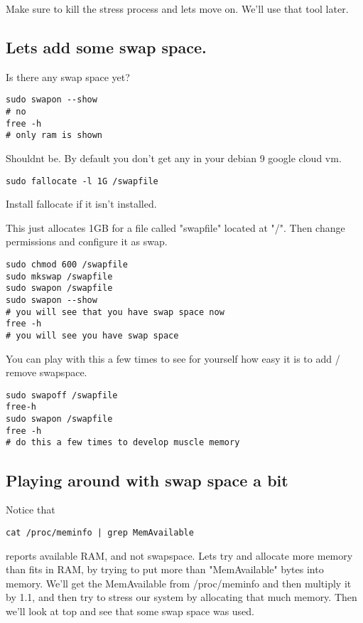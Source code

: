 \documentclass[10pt]{article}
\begin{document}
Make sure to kill the stress process and lets move on. We'll use that tool later.

\subsection{ Lets add some swap space.}
Is there any swap space yet?

\begin{lstlisting}
sudo swapon --show
# no
free -h
# only ram is shown
\end{lstlisting}

Shouldnt be. By default you don't get any in your debian 9 google cloud vm.


\begin{lstlisting}
sudo fallocate -l 1G /swapfile
\end{lstlisting}

Install fallocate if it isn't installed.

This just allocates 1GB for a file called "swapfile" located at "/". Then change permissions and configure it as swap.

\begin{lstlisting}
sudo chmod 600 /swapfile
sudo mkswap /swapfile
sudo swapon /swapfile
sudo swapon --show 
# you will see that you have swap space now
free -h
# you will see you have swap space
\end{lstlisting}

You can play with this a few times to see for yourself how easy it is to add / remove swapspace.

\begin{lstlisting}
sudo swapoff /swapfile
free-h
sudo swapon /swapfile
free -h
# do this a few times to develop muscle memory
\end{lstlisting}


\subsection{Playing around with swap space a bit}
Notice that 
\begin{lstlisting}
cat /proc/meminfo | grep MemAvailable
\end{lstlisting}

reports available RAM, and not swapspace. Lets try and allocate more memory than fits in RAM, by trying to put more than "MemAvailable" bytes into memory. We'll get the MemAvailable from /proc/meminfo and then multiply it by 1.1, and then try to stress our system by allocating that much memory. Then we'll look at top and see that some swap space was used.
\end{document}
